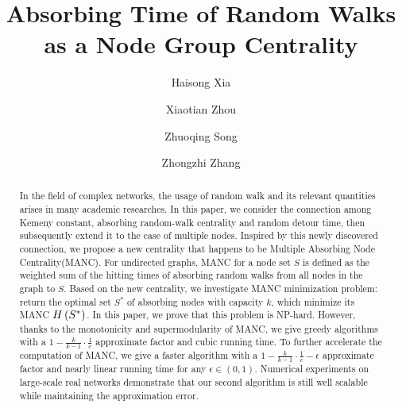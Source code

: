 \documentclass[sigconf]{acmart}
\begin{document}
\sloppy
\fancyhead{}
\title{Absorbing Time of Random Walks as a Node Group Centrality}
\author{Haisong Xia}
\author{Xiaotian Zhou}
\author{Zhuoqing Song}
\author{Zhongzhi Zhang\footnotemark}
\begin{abstract}
  In the field of complex networks, the usage of random walk and its relevant quantities arises in many academic researches.
  In this paper, we consider the connection among Kemeny constant, absorbing random-walk centrality and random detour time, then subsequently extend it to the case of multiple nodes.
  Inspired by this newly discovered connection, we propose a new centrality that happens to be Multiple Absorbing Node Centrality(MANC).
  For undirected graphs, MANC for a node set \(S\) is defined as the weighted sum of the hitting times of absorbing random walks from all nodes in the graph to \(S\).
  Based on the new centrality, we investigate MANC minimization problem: return the optimal set \(S^*\) of absorbing nodes with capacity \(k\), which minimize its MANC \(H\left(S^*\right)\).
  In this paper, we prove that this problem is NP-hard.
  However, thanks to the monotonicity and supermodularity of MANC, we give greedy algorithms with a \(1-\frac{k}{k-1}\cdot\frac{1}{e}\) approximate factor and cubic running time.
  To further accelerate the computation of MANC, we give a faster algorithm with a \(1-\frac{k}{k-1}\cdot\frac{1}{e}-\epsilon\) approximate factor and nearly linear running time for any \(\epsilon\in(0,1)\).
  Numerical experiments on large-scale real networks demonstrate that our second algorithm is still well scalable while maintaining the approximation error.
\end{abstract}
\maketitle
\renewcommand{\thefootnote}{*}
\end{document}
